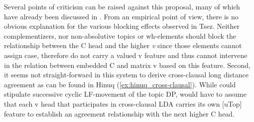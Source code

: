 \documentclass[output=paper
,modfonts
,nonflat]{langsci/langscibook}
\begin{document}
\begin{exe}
\begin{multicols}{2}\raggedcolumns
	\ex \label{tree:bk_first}
	\columnbreak
	\ex \label{tree:bk_second}
\end{multicols}
\end{exe} 

Several points of criticism can be raised against this proposal, many of which have already been discussed in \citet{Preminger_Polinsky2015}. From an empirical point of view, there is no obvious explanation for the various blocking effects observed in Tsez. Neither complementizers, nor non-absolutive topics or wh-elements should block the relationship between the C head and the higher \textit{v} since those elements cannot assign case, therefore do not carry a valued v feature and thus cannot intervene in the relation between embedded C and matrix v based on this feature. Second, it seems not straight-forward in this system to derive cross-clausal long distance agreement as can be found in Hinuq (\ref{ex:hinuq_cross-clausal}). While \citet{Polinsky_Potsdam2001} could stipulate successive cyclic LF-movement of the topic DP, \citet{Bjorkman_Zeijlstra2014} would have to assume that each v head that participates in cross-clausal LDA carries its own [uTop] feature to establish an agreement relationship with the next higher C head.
\end{document}
